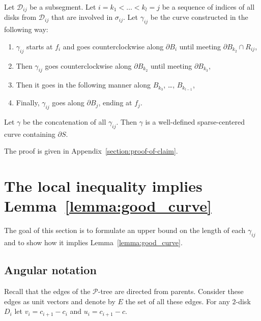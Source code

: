 \begin{claim}\label{lemma:can-construct-gamma-ij}
Let $\mathcal{D}_{ij}$ be a subsegment. Let $i = k_1 < \ldots < k_l = j$ be a sequence of indices of all disks from $\mathcal{D}_{ij}$ that are involved in $\sigma_{ij}$. Let $\gamma_{ij}$ be the curve constructed in the following way:
\begin{enumerate}
    \item $\gamma_{ij}$ starts at $f_i$ and goes counterclockwise along $\partial B_i$ until meeting $\partial B_{k_2}\cap R_{ij}$,
    \item Then $\gamma_{ij}$ goes counterclockwise along $\partial B_{k_2}$ until meeting $\partial B_{k_3}$,
    \item Then it goes in the following manner along $B_{k_3}$, \ldots, $B_{k_{l-1}}$,
    \item Finally, $\gamma_{ij}$ goes along $\partial B_j$, ending at $f_j$.
\end{enumerate}
Let $\gamma$ be the concatenation of all $\gamma_{ij}$. Then $\gamma$ is a well-defined sparse-centered curve containing $\partial S$.
\end{claim}

The proof is given in Appendix~\ref{section:proof-of-claim}.


\section{The local inequality implies Lemma~\ref{lemma:good_curve}}

The goal of this section is to formulate an upper bound on the length of each $\gamma_{ij}$ and to show how it implies Lemma~\ref{lemma:good_curve}.

\subsection{Angular notation}

Recall that the edges of the $\mathcal{P}$-tree are directed from parents. Consider these edges as unit vectors and denote by $E$ the set of all these edges.
For any $2$-disk $D_i$ let $v_i = c_{i+1} - c_i$ and $u_i = c_{i+1} - c$.

